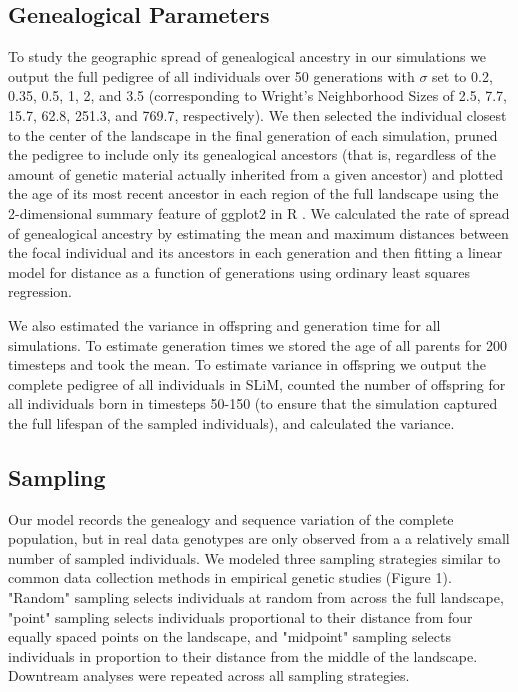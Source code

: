 \documentclass[9pt,twocolumn,twoside,lineno]{gsajnl}
\begin{document}
\subsection{Genealogical Parameters}
To study the geographic spread of genealogical ancestry in our simulations we output the full pedigree of all individuals over 50 generations with $\sigma$ set to 0.2, 0.35, 0.5, 1, 2, and 3.5 (corresponding to Wright's Neighborhood Sizes of 2.5, 7.7, 15.7, 62.8, 251.3, and 769.7, respectively). We then selected the individual closest to the center of the landscape in the final generation of each simulation, pruned the pedigree to include only its genealogical ancestors (that is, regardless of the amount of genetic material actually inherited from a given ancestor) and plotted the age of its most recent ancestor in each region of the full landscape using the 2-dimensional summary feature of ggplot2 in R \citep{Wickham2016}. We calculated the rate of spread of genealogical ancestry by estimating the mean and maximum distances between the focal individual and its ancestors in each generation and then fitting a linear model for distance as a function of generations using ordinary least squares regression. 

We also estimated the variance in offspring and generation time for all simulations. To estimate generation times we stored the age of all parents for 200 timesteps and took the mean. To estimate variance in offspring we output the complete pedigree of all individuals in SLiM, counted the number of offspring for all individuals born in timesteps 50-150 (to ensure that the simulation captured the full lifespan of the sampled individuals), and calculated the variance. 

\subsection{Sampling}
Our model records the genealogy and sequence variation of the complete population, but in real data genotypes are only observed from a a relatively small number of sampled individuals. We modeled three sampling strategies similar to common data collection methods in empirical genetic studies (Figure 1). "Random" sampling selects individuals at random from across the full landscape, "point" sampling selects individuals proportional to their distance from four equally spaced points on the landscape, and "midpoint" sampling selects individuals in proportion to their distance from the middle of the landscape. Downtream analyses were repeated across all sampling strategies. 
\end{document}
